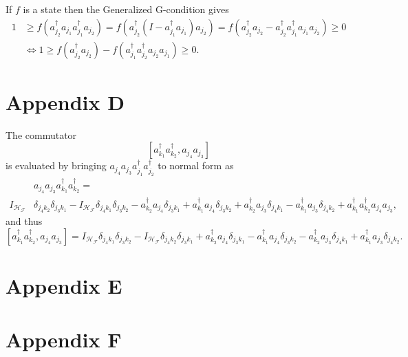 \documentclass[aps,preprint]{revtex4}%
\begin{document}
If $f$ is a state then the Generalized G-condition gives
\begin{align}
1  &  \geq f\left(  a_{j_{2}}^{\dagger}a_{j_{1}}a_{j_{1}}^{\dagger}a_{j_{2}%
}\right)  =f\left(  a_{j_{2}}^{\dagger}\left(  I-a_{j_{1}}^{\dagger}a_{j_{1}%
}\right)  a_{j_{2}}\right)  =f\left(  a_{j_{2}}^{\dagger}a_{j_{2}}-a_{j_{2}%
}^{\dagger}a_{j_{1}}^{\dagger}a_{j_{1}}a_{j_{2}}\right)  \geq0\nonumber\\
&  \Leftrightarrow1\geq f\left(  a_{j_{2}}^{\dagger}a_{j_{2}}\right)
-f\left(  a_{j_{1}}^{\dagger}a_{j_{2}}^{\dagger}a_{j_{2}}a_{j_{1}}\right)
\geq0.
\end{align}


\section{Appendix D \label{Commutation Relationship}}

The commutator%
\begin{equation}
\left[  a_{k_{1}}^{\dagger}a_{k_{2}}^{\dagger},a_{j_{4}}a_{j_{3}}\right]
\end{equation}
is evaluated by bringing $a_{j_{4}}a_{j_{3}}a_{j_{1}}^{\dagger}a_{j_{2}%
}^{\dagger}$ to normal form as
\begin{align}
&  a_{j_{4}}a_{j_{3}}a_{k_{1}}^{\dagger}a_{k_{2}}^{\dagger}=\nonumber\\
I_{\mathcal{H}_{\mathcal{F}}} &  \delta_{j_{4}k_{2}}\delta_{j_{3}k_{1}%
}-I_{\mathcal{H}_{\mathcal{F}}}\delta_{j_{4}k_{1}}\delta_{j_{3}k_{2}}%
-a_{k_{2}}^{\dagger}a_{j_{4}}\delta_{j_{3}k_{1}}+a_{k_{1}}^{\dagger}a_{j_{4}%
}\delta_{j_{3}k_{2}}+a_{k_{2}}^{\dagger}a_{j_{3}}\delta_{j_{4}k_{1}}-a_{k_{1}%
}^{\dagger}a_{j_{3}}\delta_{j_{4}k_{2}}+a_{k_{1}}^{\dagger}a_{k_{2}}^{\dagger
}a_{j_{4}}a_{j_{3}},
\end{align}
and thus
\begin{equation}
\left[  a_{k_{1}}^{\dagger}a_{k_{2}}^{\dagger},a_{j_{4}}a_{j_{3}}\right]
=I_{\mathcal{H}_{\mathcal{F}}}\delta_{j_{4}k_{1}}\delta_{j_{3}k_{2}%
}-I_{\mathcal{H}_{\mathcal{F}}}\delta_{j_{4}k_{2}}\delta_{j_{3}k_{1}}%
+a_{k_{2}}^{\dagger}a_{j_{4}}\delta_{j_{3}k_{1}}-a_{k_{1}}^{\dagger}a_{j_{4}%
}\delta_{j_{3}k_{2}}-a_{k_{2}}^{\dagger}a_{j_{3}}\delta_{j_{4}k_{1}}+a_{k_{1}%
}^{\dagger}a_{j_{3}}\delta_{j_{4}k_{2}}.
\end{equation}


\section{Appendix E \label{SecQuant}}

\section{Appendix F \label{Number}}



\end{document}
